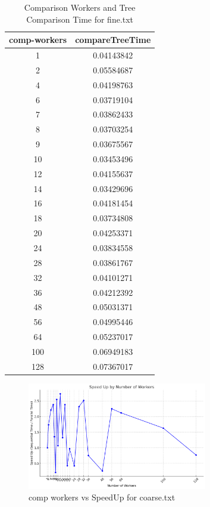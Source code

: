 \documentclass[letterpaper,12pt]{article}
\theoremstyle{remark}
\begin{document}
\begin{table}[h]
\centering
\begin{tabular}{|c|c|}
\hline
\textbf{comp-workers} & \textbf{compareTreeTime} \\ \hline
1  & 0.04143842 \\ \hline
2  & 0.05584687 \\ \hline
4  & 0.04198763 \\ \hline
6  & 0.03719104 \\ \hline
7  & 0.03862433 \\ \hline
8  & 0.03703254 \\ \hline
9  & 0.03675567 \\ \hline
10 & 0.03453496 \\ \hline
12 & 0.04155637 \\ \hline
14 & 0.03429696 \\ \hline
16 & 0.04181454 \\ \hline
18 & 0.03734808 \\ \hline
20 & 0.04253371 \\ \hline
24 & 0.03834558 \\ \hline
28 & 0.03861767 \\ \hline
32 & 0.04101271 \\ \hline
36 & 0.04212392 \\ \hline
48 & 0.05031371 \\ \hline
56 & 0.04995446 \\ \hline
64 & 0.05237017 \\ \hline
100& 0.06949183 \\ \hline
128& 0.07367017 \\ \hline
\end{tabular}
\caption{Comparison Workers and Tree Comparison Time for fine.txt}
\label{table:workers_time}
\end{table}

\clearpage

\begin{figure}[ht]
    \centering
    \includegraphics[width=0.7\textwidth]{compworkerSpeedUpcoarse.png}
    \caption{comp workers vs SpeedUp  for coarse.txt}
    \label{fig:Hashworkers vs SpeedUp}
\end{figure}
\end{document}
